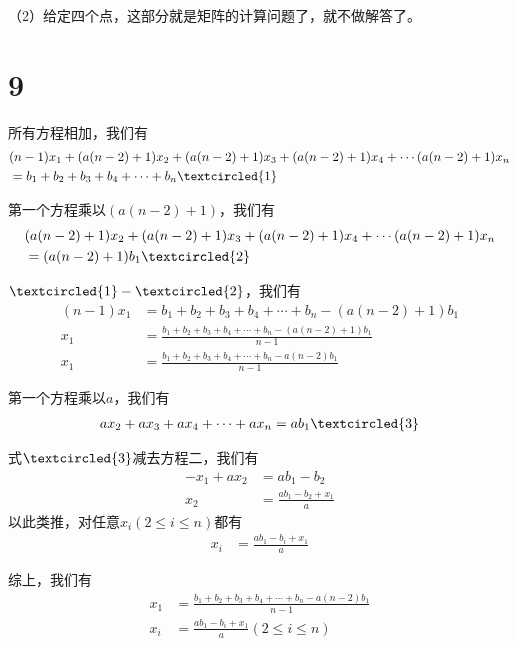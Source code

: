 \documentclass{article}
\begin{document}
（2）给定四个点，这部分就是矩阵的计算问题了，就不做解答了。

\section*{9}

所有方程相加，我们有
\begin{align*}
   & (n-1)x_1 + (a(n-2) + 1)x_2 + (a(n-2) + 1)x_3 + (a(n-2) + 1)x_4 + \cdots (a(n-2) + 1)x_n \\
   & = b_1 + b_2 + b_3 + b_4 + \cdots + b_n \textcircled{1}
\end{align*}

第一个方程乘以$(a(n-2) + 1)$，我们有
\begin{align*}
   & (a(n-2) + 1)x_2 + (a(n-2) + 1)x_3 + (a(n-2) + 1)x_4 + \cdots (a(n-2) + 1)x_n \\
   & = (a(n-2) + 1)b_1 \textcircled{2}
\end{align*}

$\textcircled{1} - \textcircled{2}$，我们有
\begin{align*}
  (n-1)x_1 & = b_1 + b_2 + b_3 + b_4 + \cdots + b_n - (a(n-2) + 1)b_1               \\
  x_1      & = \frac{b_1 + b_2 + b_3 + b_4 + \cdots + b_n - (a(n-2) + 1)b_1}{n - 1} \\
  x_1      & = \frac{b_1 + b_2 + b_3 + b_4 + \cdots + b_n - a(n-2)b_1}{n - 1}
\end{align*}


第一个方程乘以$a$，我们有
\begin{align*}
  a x_2 + ax_3 + ax_4 + \cdots + ax_n = ab_1 \textcircled{3}
\end{align*}

式$\textcircled{3}$减去方程二，我们有
\begin{align*}
  -x_1 + ax_2 & = ab_1 - b_2                 \\
  x_2         & = \frac{ab_1 - b_2 + x_1}{a}
\end{align*}
以此类推，对任意$x_i(2 \leq i \leq n)$都有
\begin{align*}
  x_i & = \frac{ab_1 - b_i + x_1}{a}
\end{align*}

综上，我们有
\begin{align*}
  x_1 & = \frac{b_1 + b_2 + b_3 + b_4 + \cdots + b_n - a(n-2)b_1}{n - 1} \\
  x_i & = \frac{ab_1 - b_i + x_1}{a} (2 \leq i \leq n)
\end{align*}
\end{document}

